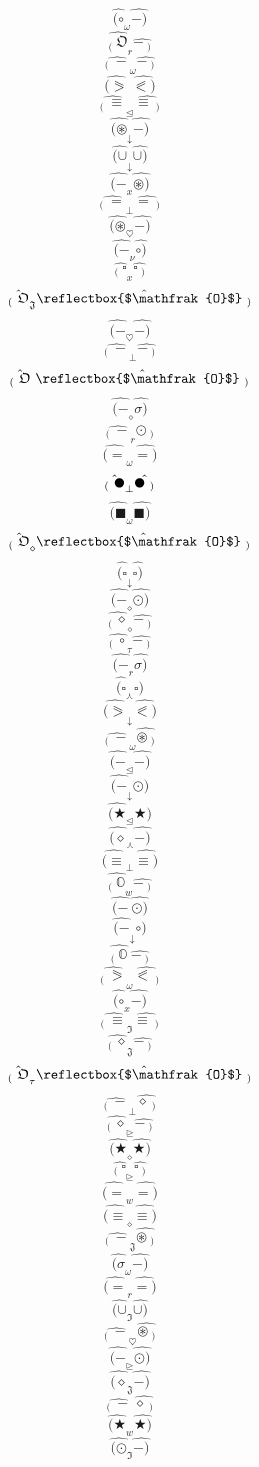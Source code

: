 \documentclass[12pt]{article}
\begin{document}
\begin{multicols}{5}
$$\hat{(\circ} _\omega \hat{-)}$$
$$\hat{_( \ \mathfrak{O}} _r \hat{-\ _)}$$
$$\hat{_( \ -} _\omega \hat{-\ _)}$$
$$\hat{(\eqslantgtr} \  \hat{\eqslantless)}$$
$$\hat{_( \ \equiv} _\trianglelefteq \hat{\equiv\ _)}$$
$$\hat{(\circledast} _\downarrow \hat{-)}$$
$$\hat{(\cup} _\downarrow \hat{\cup)}$$
$$\hat{(-} _x \hat{\circledast)}$$
$$\hat{_( \ =} _\bot \hat{=\ _)}$$
$$\hat{(\circledast} _\heartsuit \hat{-)}$$
$$\hat{(-} _\nu \hat{\circ)}$$
$$\hat{_( \ \square} _x \hat{\square\ _)}$$
$$\hat{_( \ \mathfrak{O}} _\mathfrak{J} \hat{\reflectbox{$\mathfrak{O}$}\ _)}$$
$$\hat{(-} _\heartsuit \hat{-)}$$
$$\hat{_( \ -} _\bot \hat{-\ _)}$$
$$\hat{_( \ \mathfrak{O}} \  \hat{\reflectbox{$\mathfrak{O}$}\ _)}$$
$$\hat{(-} _\diamond \hat{\sigma)}$$
$$\hat{_( \ -} _r \hat{\odot\ _)}$$
$$\hat{(=} _\omega \hat{=)}$$
$$\hat{_( \ \newmoon} _\bot \hat{\newmoon\ _)}$$
$$\hat{(\blacksquare} _\omega \hat{\blacksquare)}$$
$$\hat{_( \ \mathfrak{O}} _\diamond \hat{\reflectbox{$\mathfrak{O}$}\ _)}$$
$$\hat{(\square} _\downarrow \hat{\square)}$$
$$\hat{(-} _\diamond \hat{\odot)}$$
$$\hat{_( \ \diamond} _\diamond \hat{-\ _)}$$
$$\hat{_( \ \circ} _\tau \hat{-\ _)}$$
$$\hat{(-} _r \hat{\sigma)}$$
$$\hat{(\square} _\curlywedge \hat{\square)}$$
$$\hat{(\eqslantgtr} _\downarrow \hat{\eqslantless)}$$
$$\hat{_( \ -} _\omega \hat{\circledast\ _)}$$
$$\hat{(-} _\trianglelefteq \hat{-)}$$
$$\hat{(-} _\downarrow \hat{\odot)}$$
$$\hat{(\bigstar} _\trianglelefteq \hat{\bigstar)}$$
$$\hat{(\diamond} _\curlywedge \hat{-)}$$
$$\hat{(\equiv} _\bot \hat{\equiv)}$$
$$\hat{_( \ \mathbb{O}} _w \hat{-\ _)}$$
$$\hat{(-} \  \hat{\odot)}$$
$$\hat{(-} _\downarrow \hat{\circ)}$$
$$\hat{_( \ \mathbb{O}} \  \hat{-\ _)}$$
$$\hat{_( \ \eqslantgtr} _\omega \hat{\eqslantless\ _)}$$
$$\hat{(\circ} _x \hat{-)}$$
$$\hat{_( \ \equiv} _\mathfrak{I} \hat{\equiv\ _)}$$
$$\hat{_( \ \diamond} _\mathfrak{J} \hat{-\ _)}$$
$$\hat{_( \ \mathfrak{O}} _\tau \hat{\reflectbox{$\mathfrak{O}$}\ _)}$$
$$\hat{_( \ -} _\bot \hat{\diamond\ _)}$$
$$\hat{_( \ \diamond} _\trianglerighteq \hat{-\ _)}$$
$$\hat{(\bigstar} _\diamond \hat{\bigstar)}$$
$$\hat{_( \ \square} _\trianglerighteq \hat{\square\ _)}$$
$$\hat{(=} _w \hat{=)}$$
$$\hat{(\equiv} _\diamond \hat{\equiv)}$$
$$\hat{_( \ -} _\mathfrak{J} \hat{\circledast\ _)}$$
$$\hat{(\sigma} _\omega \hat{-)}$$
$$\hat{(=} _r \hat{=)}$$
$$\hat{(\cup} _\mathfrak{I} \hat{\cup)}$$
$$\hat{_( \ -} _\heartsuit \hat{\circledast\ _)}$$
$$\hat{(-} _\trianglerighteq \hat{\odot)}$$
$$\hat{(\diamond} _\mathfrak{J} \hat{-)}$$
$$\hat{_( \ -} \  \hat{\diamond\ _)}$$
$$\hat{(\bigstar} _w \hat{\bigstar)}$$
$$\hat{(\odot} _\mathfrak{I} \hat{-)}$$

\end{multicols}
\end{document}
